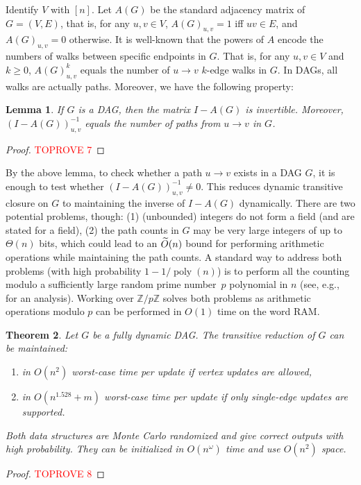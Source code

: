 \documentclass[11pt]{article}
\newtheorem{theorem}{Theorem}[section]
\newtheorem{lemma}[theorem]{Lemma}
\newcommand{\poly}[1]{\ensuremath{\operatorname{poly}\left( #1 \right)}\xspace}
\begin{document}
{Identify $V$ with $[n]$. Let $A(G)$ be the standard adjacency matrix of $G=(V,E)$, that is,
for any $u,v\in V$, $A(G)_{u,v}=1$ iff $uv\in E$, and $A(G)_{u,v}=0$ otherwise.
It is well-known that the powers of $A$ encode
the numbers of walks between specific endpoints in $G$. That is, for any $u,v\in V$
and $k\geq 0$, $A(G)_{u,v}^k$ equals the number of $u\to v$ $k$-edge walks in $G$.
In DAGs, all walks are actually paths. Moreover, we have the following property:
\begin{lemma}\label{lem:dag-path-count}
    If $G$ is a DAG, then the matrix $I-A(G)$ is invertible. Moreover, $(I-A(G))^{-1}_{u,v}$
    equals the number of paths from $u\to v$ in $G$.
\end{lemma}
\begin{proof}\textcolor{red}{TOPROVE 7}\end{proof}
By the above lemma, to check whether a path $u\to v$ exists in a DAG $G$, it is enough to test whether $(I-A(G))^{-1}_{u,v}\neq 0$.
This reduces dynamic transitive closure on $G$ to maintaining the inverse of $I-A(G)$ dynamically.
There are two potential problems, though: (1) (unbounded) integers do not form a field (and  are stated for a field), (2) the path counts in $G$ may be very large integers of up to $\Theta(n)$
bits, which could lead to an $\widetilde{O}(n)$ bound for performing arithmetic operations while maintaining the path counts. A standard way to address both problems (with high probability $1-1/\poly{n}$) is to perform all the counting modulo a sufficiently large random prime number~$p$ polynomial in $n$ (see, e.g.,~\cite[Section~3.4]{DBLP:journals/jcss/KingS02} for an analysis). Working over $\mathbb{Z}/p\mathbb{Z}$ solves both problems as arithmetic operations modulo $p$ can be performed in $O(1)$ time on the word RAM.

\begin{theorem}\label{thm:algebraic-dag}
    Let $G$ be a fully dynamic DAG. The transitive reduction of $G$ can be maintained:
    \begin{enumerate}[label=(\arabic*)]
        \item in $O(n^2)$ worst-case time per update if vertex updates are allowed,
        \item in $O(n^{1.528}+m)$ worst-case time per update if only single-edge updates are supported.
    \end{enumerate}
    Both data structures are Monte Carlo randomized and give correct outputs with high probability.
    They can be initialized in $O(n^\omega)$ time and use $O(n^2)$ space.
\end{theorem}
\begin{proof}\textcolor{red}{TOPROVE 8}\end{proof}



}
\end{document}
